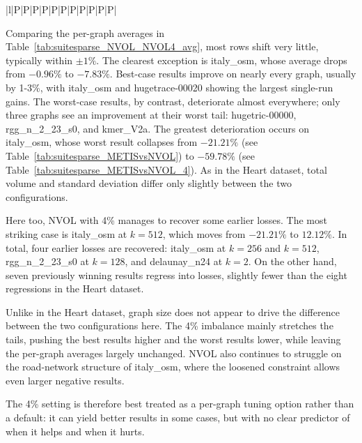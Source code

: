 \begin{table}[h]
{\begin{tabular}{|l|P|P|P|P|P|P|P|P|P|P|P|}
		\hline
	\end{tabular}
	}
	\caption{Percentage difference of $MV^{\mathrm{max}}_{\mathrm{NVOL}}$ at 4\% imbalance relative to $MV^{\mathrm{max}}_{\mathrm{VOL}}$ for the SuiteSparse Matrix Collection selection across different $k$, computed as $(MV^{\mathrm{max}}_{\mathrm{VOL}} - MV^{\mathrm{max}}_{\mathrm{NVOL}}) / MV^{\mathrm{max}}_{\mathrm{VOL}} \times 100$. Positive values indicate that NVOL 4\% achieves a lower maximum. Cells marked N/A indicate that the number of partitions was too large for the graph size; cells marked N/R indicate runs where NVOL did not complete.}
	\label{tab:suitesparse_METISvsNVOL_4}
\end{table}

Comparing the per-graph averages in Table~\ref{tab:suitesparse_NVOL_NVOL4_avg}, most rows shift very little, typically within $\pm 1\%$. The clearest exception is italy\_osm, whose average drops from $-0.96\%$ to $-7.83\%$. Best-case results improve on nearly every graph, usually by 1-3\%, with italy\_osm and hugetrace-00020 showing the largest single-run gains. The worst-case results, by contrast, deteriorate almost everywhere; only three graphs see an improvement at their worst tail: hugetric-00000, rgg\_n\_2\_23\_s0, and kmer\_V2a. The greatest deterioration occurs on italy\_osm, whose worst result collapses from $-21.21\%$ (see Table~\ref{tab:suitesparse_METISvsNVOL}) to $-59.78\%$ (see Table~\ref{tab:suitesparse_METISvsNVOL_4}). As in the Heart dataset, total volume and standard deviation differ only slightly between the two configurations.

Here too, NVOL with 4\% manages to recover some earlier losses. The most striking case is italy\_osm at $k=512$, which moves from $-21.21\%$ to $12.12\%$. In total, four earlier losses are recovered: italy\_osm at $k=256$ and $k=512$, rgg\_n\_2\_23\_s0 at $k=128$, and delaunay\_n24 at $k=2$. On the other hand, seven previously winning results regress into losses, slightly fewer than the eight regressions in the Heart dataset.

Unlike in the Heart dataset, graph size does not appear to drive the difference between the two configurations here. The 4\% imbalance mainly stretches the tails, pushing the best results higher and the worst results lower, while leaving the per-graph averages largely unchanged. NVOL also continues to struggle on the road-network structure of italy\_osm, where the loosened constraint allows even larger negative results.

The 4\% setting is therefore best treated as a per-graph tuning option rather than a default: it can yield better results in some cases, but with no clear predictor of when it helps and when it hurts.

